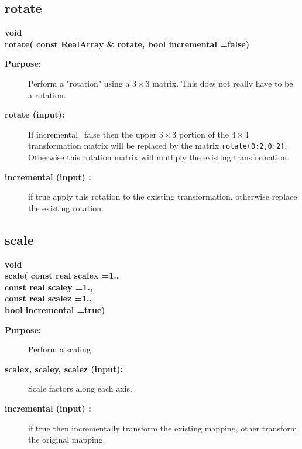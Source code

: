 \subsection{rotate}
 
\begin{flushleft} \textbf{%
void  \\ 
\settowidth{\MatrixTransformIncludeArgIndent}{rotate(}%
rotate( const RealArray \& rotate, bool incremental  =false)
}\end{flushleft}
\begin{description}
\item[{\bf Purpose:}]  Perform a "rotation" using a $3\times3$ matrix. This does not really have to
  be a rotation. 
\item[{\bf rotate (input):}]  If incremental=false then the upper $3\times3$ portion of the $4\times4$ transformation
    matrix will be replaced by the matrix {\tt rotate(0:2,0:2)}. Otherwise this rotation matrix
    will mutliply the existing transformation.
\item[{\bf incremental (input) :}]  if true apply this rotation to the existing transformation,
    otherwise replace the existing rotation.
\end{description}
\subsection{scale}
 
\begin{flushleft} \textbf{%
void  \\ 
\settowidth{\MatrixTransformIncludeArgIndent}{scale(}%
scale( const real scalex  =1.,\\ 
\hspace{\MatrixTransformIncludeArgIndent}const real scaley  =1., \\ 
\hspace{\MatrixTransformIncludeArgIndent}const real scalez  =1., \\ 
\hspace{\MatrixTransformIncludeArgIndent}bool incremental   =true)
}\end{flushleft}
\begin{description}
\item[{\bf Purpose:}]  Perform a scaling
\item[{\bf scalex, scaley, scalez (input):}]  Scale factors along each axis.
\item[{\bf incremental (input) :}]  if true then incrementally transform the 
       existing mapping, other transform the original mapping.
\end{description}
